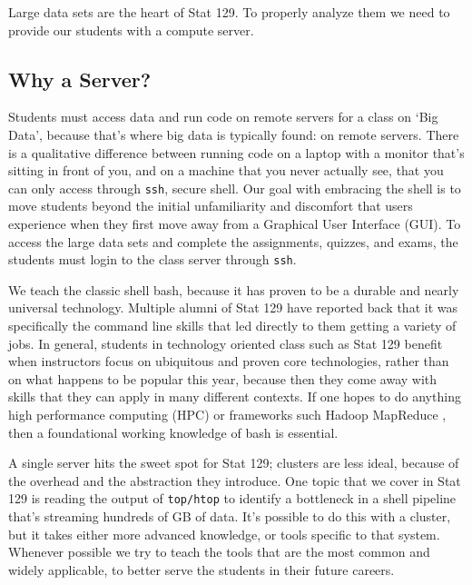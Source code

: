\documentclass[12pt]{article}
\begin{document}
Large data sets are the heart of Stat 129.
To properly analyze them we need to provide our students with a compute server.


\subsection{Why a Server?}
\label{sec:server}

Students must access data and run code on remote servers for a class on `Big Data', because that's where big data is typically found: on remote servers.
There is a qualitative difference between running code on a laptop with a monitor that's sitting in front of you, and on a machine that you never actually see, that you can only access through \texttt{ssh}, secure shell.
Our goal with embracing the shell is to move students beyond the initial unfamiliarity and discomfort that users experience when they first move away from a Graphical User Interface (GUI).
To access the large data sets and complete the assignments, quizzes, and exams, the students must login to the class server through \texttt{ssh}.

We teach the classic shell bash, because it has proven to be a durable and nearly universal technology.
Multiple alumni of Stat 129 have reported back that it was specifically the command line skills that led directly to them getting a variety of jobs.
In general, students in technology oriented class such as Stat 129 benefit when instructors focus on ubiquitous and proven core technologies, rather than on what happens to be popular this year, because then they come away with skills that they can apply in many different contexts.
If one hopes to do anything high performance computing (HPC) or frameworks such Hadoop MapReduce \cite{white2012hadoop}, then a foundational working knowledge of bash is essential.

A single server hits the sweet spot for Stat 129; clusters are less ideal, because of the overhead and the abstraction they introduce.
One topic that we cover in Stat 129 is reading the output of \texttt{top/htop} to identify a bottleneck in a shell pipeline that's streaming hundreds of GB of data.
It's possible to do this with a cluster, but it takes either more advanced knowledge, or tools specific to that system.
Whenever possible we try to teach the tools that are the most common and widely applicable, to better serve the students in their future careers.
\end{document}
